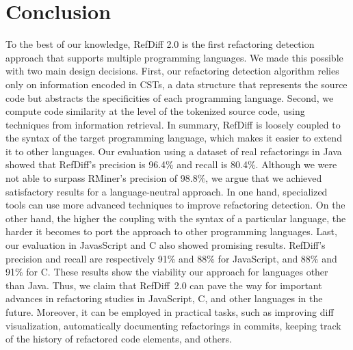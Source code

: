 \documentclass[10pt,journal,compsoc]{IEEEtran}
\begin{document}




\section{Conclusion}
\label{SecConclusion}

To the best of our knowledge, RefDiff 2.0 is the first refactoring detection approach that supports multiple programming languages.
We made this possible with two main design decisions. First, our refactoring detection algorithm relies only on information encoded in CSTs, a data structure that represents the source code but abstracts the specificities of each programming language.
Second, we compute code similarity at the level of the tokenized source code, using techniques from information retrieval.
In summary, RefDiff is loosely coupled to the syntax of the target programming language, which makes it easier to extend it to other languages.
Our evaluation using a dataset of real refactorings in Java showed that RefDiff's precision is 96.4\% and recall is 80.4\%.
Although we were not able to surpass RMiner's precision of 98.8\%, we argue that we achieved satisfactory results for a language-neutral approach.
In one hand, specialized tools can use more advanced techniques to improve refactoring detection.
On the other hand, the higher the coupling with the syntax of a particular language, the harder it becomes to port the approach to other programming languages.
Last, our evaluation in JavasScript and C also showed promising results. RefDiff's precision and recall are respectively 91\% and 88\% for JavaScript, and 88\% and 91\% for C.
These results show the viability our approach for languages other than Java.
Thus, we claim that RefDiff~2.0 can pave the way for important advances in refactoring studies in JavaScript, C, and other languages in the future.
Moreover, it can be employed in practical tasks, such as improving diff visualization, automatically documenting refactorings in commits, keeping track of the history of refactored code elements, and others.
\end{document}
